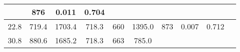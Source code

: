 \documentclass[a4paper,10pt]{article}
\begin{document}
\begin{longtable}{
     |
%    
    c|
%    
    c|
%    
    c|
%    
    c|
%    
    c|
%    
    c|
%    
    c|
%    
    c|
%    
    c|
%    
    c|
%    
    }
%        
        & 876
%        

%        

%        
        & 0.011
%        

%        

%        
        & 0.704
%        

%        
        \\
        \hline

        

%        

%        
        22.8
%        

%        

%        
        & 719.4
%        

%        

%        
        & 1703.4
%        

%        

%        
        & 718.3
%        

%        

%        
        & 660
%        

%        

%        
        & 1395.0
%        

%        

%        
        & 873
%        

%        

%        
        & 0.007
%        

%        

%        
        & 0.712
%        

%        
        \\
        \hline

        

%        

%        
        30.8
%        

%        

%        
        & 880.6
%        

%        

%        
        & 1685.2
%        

%        

%        
        & 718.3
%        

%        

%        
        & 663
%        

%        

%        
        & 785.0
%        

%        


\end{longtable}
\end{document}
